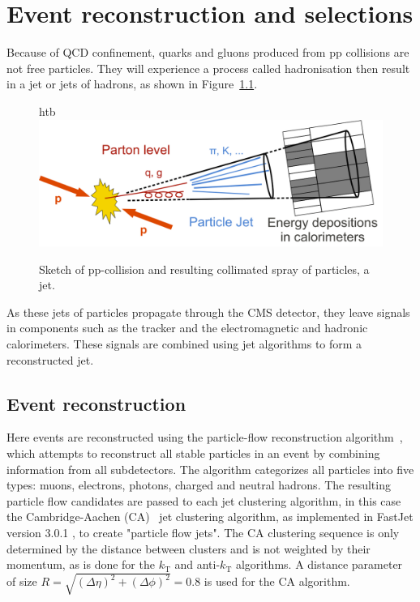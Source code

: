 \chapter{Event reconstruction and selections}
\label{label:EventsReconstruction}

Because of QCD confinement, quarks and gluons produced from pp collisions are not free particles. 
They will experience a process called hadronisation then result in a jet or jets of hadrons, as shown in Figure~\ref{figs:jets}. 



\begin{figure}{htb}
\centering
\includegraphics[width=.7\textwidth]{EventSelectionFigures/Sketch_PartonParticleCaloJet.png}
\caption{Sketch of pp-collision and resulting collimated spray of particles, a jet.}
\label{figs:jets}
\end{figure}  

As these jets of particles propagate through the CMS detector, they leave signals in components such as the tracker and the electromagnetic and hadronic calorimeters. These signals are combined using jet algorithms to form a reconstructed jet.  

\section{Event reconstruction}

Here events are reconstructed using the particle-flow reconstruction
algorithm~\cite{particleflow}, which attempts to reconstruct all
stable particles in an event by combining information from all
subdetectors. The algorithm categorizes all particles into five types:
muons, electrons, photons, charged and neutral hadrons. The resulting
particle flow candidates are passed to each jet clustering algorithm, in this case the
Cambridge-Aachen (CA)~\cite{CAaachen,CAcambridge}
jet clustering algorithm, as implemented in FastJet version 3.0.1 \cite{fastjet1,fastjet},
to create "particle flow jets".
The CA clustering sequence is only determined by the distance between
clusters and is not weighted by their momentum, as is done for the
$k_\text{T}$ and anti-$k_\text{T}$ algorithms. A distance parameter of
size $R=\sqrt{(\Delta \eta)^2 + (\Delta\phi)^2}=0.8$ is used for the CA algorithm.


